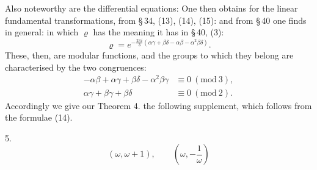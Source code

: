 Also noteworthy are the differential equations:
One then obtains for the linear fundamental transformations, from \S\,34, (13), (14), (15):
and from \S\,40 one finds in general:
in which $\varrho$ has the meaning it has in \S\,40, (3):
\[
\varrho = e^{-\frac{2\pi i}{3}(\alpha\gamma+\beta\delta-\alpha\beta-\alpha^2\beta\delta)}.
\]
These, then, are modular functions, and the groups to which they belong are characterised by the two congruences:
\[
\begin{array}{ll}
-\alpha\beta+\alpha\gamma+\beta\delta-\alpha^2\beta\gamma &\equiv 0\ (\mathrm{mod}\ 3),\\
\alpha\gamma+\beta\gamma+\beta\delta &\equiv 0\ (\mathrm{mod}\ 2).
\end{array}
\]
Accordingly we give our Theorem 4. the following supplement, which follows from the formulae (14).

5. 
\[
(\omega, \omega+1), \qquad \left(\omega, -\dfrac{1}{\omega}\right)
\]
